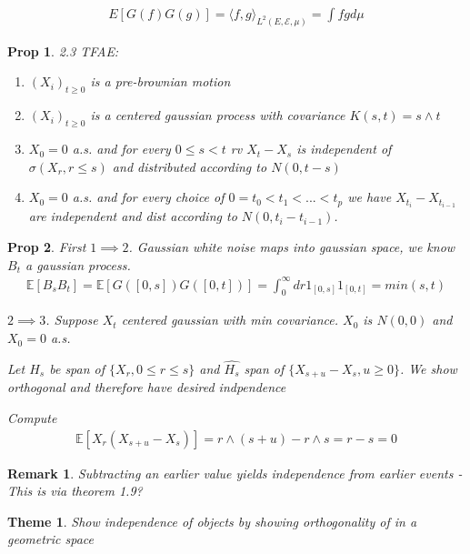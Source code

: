 \documentclass[11pt]{article}
\newcommand{\E}{\mathbb{E}}
\newtheorem{prop}{Prop}
\newtheorem{remark}{Remark}
\newtheorem{theme}{Theme}
\begin{document}
\begin{align*}
	E[G(f)G(g)] = \langle f,g\rangle_{L^2(E,\mathcal{E},\mu)} = \int fg d\mu
\end{align*}

\begin{prop} 2.3
	TFAE: 
	\begin{enumerate}
		\item $(X_i)_{t \geq 0}$ is a pre-brownian motion\\
		\item $(X_i)_{t \geq 0}$ is a centered gaussian process with covariance $K(s,t) = s \wedge t$
		\item $X_0 = 0$ a.s. and for every $0 \leq s < t$ rv $X_t - X_s$ is independent of $\sigma(X_r,r\leq s)$ and distributed according to $N(0,t-s)$
		\item $X_0 = 0$ a.s. and for every choice of $0 = t_0 < t_1 < ... < t_p$ we have $X_{t_i} - X_{t_{i-1}}$ are independent and dist according to $N(0,t_i-t_{i-1})$.
	\end{enumerate}
\end{prop}

\begin{prop}
	First $1 \implies 2$. Gaussian white noise maps into gaussian space, we know $B_t$ a gaussian process. 
	\begin{align*}
		\E[B_s B_t] = \E[G([0,s])G([0,t])] = \int_0^{\infty} dr 1_{[0,s]}1_{[0,t]} = min(s,t)
	\end{align*}

	$2 \implies 3$. Suppose $X_t$ centered gaussian with min covariance. $X_0$ is $N(0,0)$ and $X_0 = 0$ a.s. 

	Let $H_s$ be span of $\{X_r, 0\leq r \leq s\}$ and $\hat{H_s}$ span of $\{X_{s+u}-X_s, u \geq 0\}$. We show orthogonal and therefore have desired indpendence

	Compute
	\begin{align*}
		\E[X_r(X_{s+u} - X_s)] = r \wedge (s+u) - r\wedge s = r - s = 0
	\end{align*}
\end{prop}

\begin{remark}
	Subtracting an earlier value yields independence from earlier events - This is via theorem 1.9?
\end{remark}

\begin{theme}
	Show independence of objects by showing orthogonality of in a geometric space
\end{theme}
\end{document}
